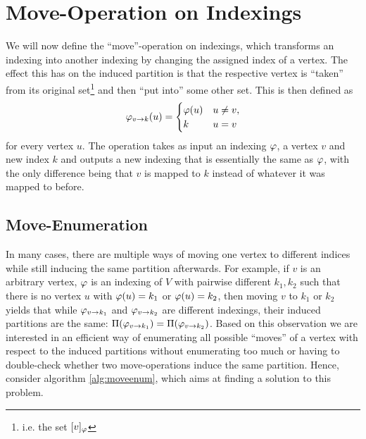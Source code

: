 \section{Move-Operation on Indexings}\label{sec:move-operation}

We will now define the ``move''-operation on indexings, which transforms an indexing into another indexing by changing the assigned index of a vertex. The effect this has on the induced partition is that the respective vertex is ``taken'' from its original set\footnote{i.e. the set $[v]_\varphi$} and then ``put into'' some other set. This is then defined as
\begin{equation} 
\varphi_{ v\rightarrow  k}(u) = \begin{cases}
    \varphi(u) & u \neq v, \\ 
    k & u = v
\end{cases} \label{eq:move-operation}
\end{equation} 
for every vertex $u$. The operation takes as input an indexing $\varphi$, a vertex $v$ and new index $k$ and outputs a new indexing that is essentially the same as $\varphi$, with the only difference being that $v$ is mapped to $k$ instead of whatever it was mapped to before.

\subsection{Move-Enumeration}

In many cases, there are multiple ways of moving one vertex to different indices while still inducing the same partition afterwards. For example, if $v$ is an arbitrary vertex, $\varphi$ is an indexing of $V$ with pairwise different $k_1,k_2$ such that there is no vertex $u$ with $\varphi(u) = k_1$ or $\varphi(u) = k_2$, then moving $v$ to $k_1$ or $k_2$ yields that while $\varphi_{v\rightarrow k_1}$ and $\varphi_{v\rightarrow k_2}$ are different indexings, their induced partitions are the same: $\Pi(\varphi_{v\rightarrow k_1}) = \Pi(\varphi_{v\rightarrow k_2})$. Based on this observation we are interested in an efficient way of enumerating all possible ``moves'' of a vertex with respect to the induced partitions without enumerating too much or having to double-check whether two move-operations induce the same partition. Hence, consider algorithm \ref{alg:moveenum}, which aims at finding a solution to this problem.


